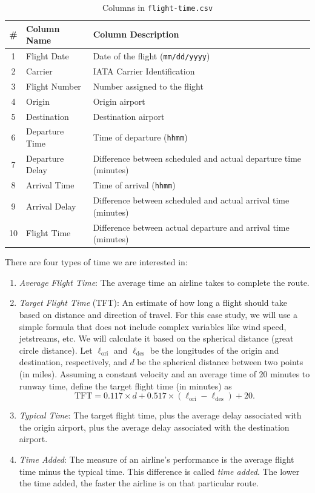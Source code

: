 \documentclass[11pt]{article}
\newcommand{\lori}{\ell_{\mathrm{ori}}}
\newcommand{\ldes}{\ell_{\mathrm{des}}}
\begin{document}
\begin{table}[htb]
\centering
\caption{Columns in \texttt{flight-time.csv}}
\label{table:ft}
\begin{tabular}{cll}
\toprule
\# & Column Name & Column Description
\\ \midrule
1 & Flight Date & Date of the flight (\texttt{mm/dd/yyyy})
\\ 2 & Carrier & IATA Carrier Identification
\\ 3 & Flight Number & Number assigned to the flight
\\ 4 & Origin & Origin airport
\\ 5 & Destination & Destination airport
\\ 6 & Departure Time & Time of departure (\texttt{hhmm})
\\ 7 & Departure Delay & Difference between scheduled and actual departure time (minutes)
\\ 8 & Arrival Time & Time of arrival (\texttt{hhmm})
\\ 9 & Arrival Delay & Difference between scheduled and actual arrival time (minutes)
\\ 10 & Flight Time & Difference between actual departure and arrival time (minutes)
\\ \bottomrule
\end{tabular}
\end{table}

There are four types of time we are interested in:
\begin{enumerate}
\item \emph{Average Flight Time}:
    The average time an airline takes to complete the route.
\item \emph{Target Flight Time} (TFT):
    An estimate of how long a flight should take based on distance and direction of travel.
    For this case study, we will use a simple formula that does not
    include complex variables like wind speed, jetstreams, etc.
    We will calculate it based on the spherical distance (great circle distance).
    Let $\lori$ and $\ldes$ be the longitudes of the origin and destination, respectively,
    and $d$ be the spherical distance between two points (in miles).
    Assuming a constant velocity and an average time of 20 minutes to runway time,
    define the target flight time (in minutes) as
    \[ \mathrm{TFT} = 0.117 \times d + 0.517 \times (\lori - \ldes) + 20. \]
\item \emph{Typical Time}:
    The target flight time, plus the average delay associated with the origin airport,
    plus the average delay associated with the destination airport.
\item \emph{Time Added}:
    The measure of an airline's performance is the average flight time minus the typical time.
    This difference is called \emph{time added}.
    The lower the time added, the faster the airline is on that particular route.
\end{enumerate}
\end{document}
